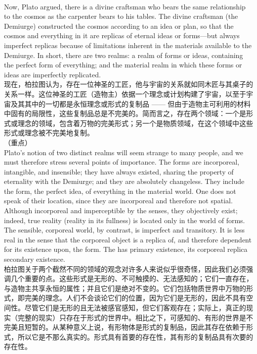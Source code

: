 \documentclass{article}
\begin{document}
\\
Now, Plato argued, there is a divine craftsman who bears the same relationship to the cosmos as the carpenter bears to his tables. The divine craftsman (the Demiurge) constructed the cosmos according to an idea or plan, so that the cosmos and everything in it are replicas of eternal ideas or forms—but always imperfect replicas because of limitations inherent in the materials available to the Demiurge. In short, there are two realms: a realm of forms or ideas, containing the perfect form of everything; and the material realm in which these forms or ideas are imperfectly replicated.\\
现在，柏拉图认为，存在一位神圣的工匠，他与宇宙的关系就如同木匠与其桌子的关系一样。这位神圣的工匠（造物主）依据一个理念或计划构建了宇宙，以至于宇宙及其其中的一切都是永恒理念或形式的复制品 —— 但由于造物主可利用的材料中固有的局限性，这些复制品总是不完美的。简而言之，存在两个领域：一个是形式或理念的领域，包含着万物的完美形式；另一个是物质领域，在这个领域中这些形式或理念被不完美地复制。\\

（重点）\\
Plato’s notion of two distinct realms will seem strange to many people, and we must therefore stress several points of importance. The forms are incorporeal, intangible, and insensible; they have always existed, sharing the property of eternality with the Demiurge; and they are absolutely changeless. They include the form, the perfect idea, of everything in the material world. One does not speak of their location, since they are incorporeal and therefore not spatial. Although incorporeal and imperceptible by the senses, they objectively exist; indeed, true reality (reality in its fullness) is located only in the world of forms. The sensible, corporeal world, by contrast, is imperfect and transitory. It is less real in the sense that the corporeal object is a replica of, and therefore dependent for its existence upon, the form. The  has primary existence, its corporeal replica secondary existence.\\
柏拉图关于两个截然不同的领域的观念对许多人来说似乎很奇怪，因此我们必须强调几个重要的点。这些形式是无形的、不可触摸的、无法感知的；它们一直存在，与造物主共享永恒的属性；并且它们是绝对不变的。它们包括物质世界中万物的形式，即完美的理念。人们不会谈论它们的位置，因为它们是无形的，因此不具有空间性。尽管它们是无形的且无法被感官感知，但它们客观存在；实际上，真正的现实（完整的现实）只存在于形式的世界中。相比之下，可感知的、有形的世界是不完美且短暂的。从某种意义上说，有形物体是形式的复制品，因此其存在依赖于形式，所以它是不那么真实的。形式具有首要的存在性，其有形的复制品具有次要的存在性。\\
\end{document}
